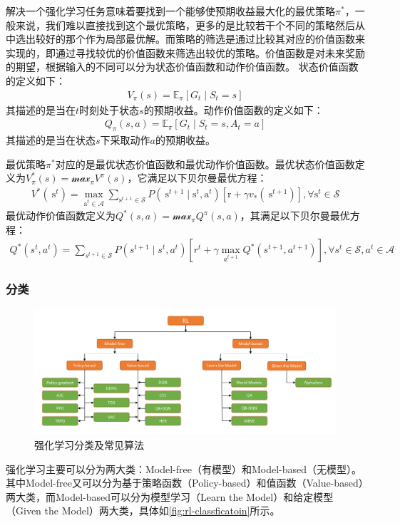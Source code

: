     解决一个强化学习任务意味着要找到一个能够使预期收益最大化的最优策略$\pi^*$，一般来说，我们难以直接找到这个最优策略，更多的是比较若干个不同的策略然后从中选出较好的那个作为局部最优解。而策略的筛选是通过比较其对应的价值函数来实现的，即通过寻找较优的价值函数来筛选出较优的策略。价值函数是对未来奖励的期望，根据输入的不同可以分为状态价值函数和动作价值函数。
状态价值函数的定义如下：
\begin{align}
    V_{\pi}(s)=\mathbb{E}_{\pi}\left[G_{t} \mid S_{t}=s\right]
\end{align}
其描述的是当在$t$时刻处于状态$s$的预期收益。动作价值函数的定义如下：
\begin{align}
    Q_{\pi}(s, a)=\mathbb{E}_{\pi}\left[G_{t} \mid S_{t}=s, A_{t}=a\right]
\end{align}
其描述的是当在状态$s$下采取动作$a$的预期收益。

最优策略$\pi^{*}$对应的是最优状态价值函数和最优动作价值函数。最优状态价值函数定义为$V_{\pi}^*(s)=\mathcal{max}_{\pi}V^{\pi}(s)$，它满足以下贝尔曼最优方程：
\begin{align}
    V^{*}\left(\mathrm{~s}^{t}\right)=\max _{\mathrm{a}^{t} \in \mathcal{A}} \sum_{\mathrm{s}^{t+1} \in \mathcal{S}} P\left(\mathrm{~s}^{t+1} \mid \mathrm{s}^{t}, \mathrm{a}^{t}\right)\left[\mathrm{r}+\gamma v_{*}\left(\mathrm{~s}^{t+1}\right)\right], \forall \mathrm{s}^{t} \in \mathcal{S}
\end{align}
最优动作价值函数定义为$Q^*(s,a)=\mathcal{max}_{\pi}Q^{\pi}(s,a)$，其满足以下贝尔曼最优方程：
\begin{align}
    Q^{*}\left(s^{t}, a^{t}\right)=\sum_{s^{t+1} \in \mathcal{S}} P\left(s^{t+1} \mid s^{t}, a^{t}\right)\left[r^{t}+\gamma \max _{a^{t+1}} Q^{*}\left(s^{t+1}, a^{t+1}\right)\right], \forall s^{t} \in \mathcal{S}, a^{t} \in \mathcal{A}
\end{align}

\subsubsection{分类}
\begin{figure}[htb]
    \includegraphics[width=1.0\textwidth]{fig/rl-classfication.pdf}
    \caption{强化学习分类及常见算法}
    \label{fig:rl-classficatoin}
\end{figure}
强化学习主要可以分为两大类：Model-free（有模型）和Model-based（无模型）。其中Model-free又可以分为基于策略函数（Policy-based）和值函数（Value-based）两大类，而Model-based可以分为模型学习（Learn the Model）和给定模型（Given the Model）两大类，具体如\autoref{fig:rl-classficatoin}所示。

